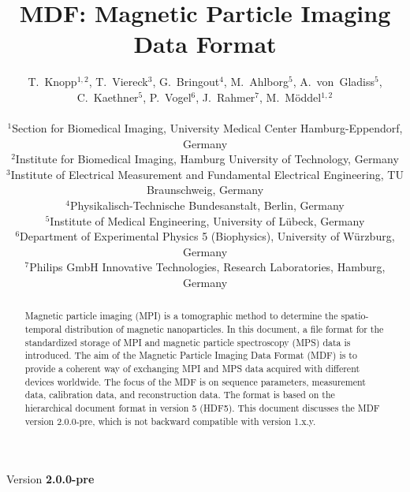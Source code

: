 \documentclass[landscape,a4paper]{article} %
\begin{document}
\title{MDF: Magnetic Particle Imaging Data Format}
\newcommand{\version}{2.0.0-pre}

\author{
T.~Knopp$^{1,2}$, T.~Viereck$^3$, G.~Bringout$^4$, M.~Ahlborg$^5$, A.~von~Gladiss$^5$, C.~Kaethner$^5$, P.~Vogel$^6$, J.~Rahmer$^7$, M.~M\"oddel$^{1,2}$ \\ \\
$^1$Section for Biomedical Imaging, University Medical Center Hamburg-Eppendorf, Germany\\
$^2$Institute for Biomedical Imaging, Hamburg University of Technology, Germany\\
$^3$Institute of Electrical Measurement and Fundamental Electrical Engineering, TU Braunschweig, Germany\\
$^4$Physikalisch-Technische Bundesanstalt, Berlin, Germany\\
$^5$Institute of Medical Engineering, University of  Lübeck, Germany\\
$^6$Department of Experimental Physics 5 (Biophysics), University of Würzburg, Germany\\
$^7$Philips GmbH Innovative Technologies, Research Laboratories, Hamburg, Germany
}

\maketitle
\begin{center}
Version \textbf{\version}
\end{center}

\begin{abstract}
Magnetic particle imaging (MPI) is a tomographic method to determine the spatio-temporal distribution of magnetic nanoparticles. In this document, a file format for the standardized storage of MPI and magnetic particle spectroscopy (MPS) data is introduced. The aim of the Magnetic Particle Imaging Data Format (MDF) is to provide a coherent way of exchanging MPI and MPS data acquired with different devices worldwide. The focus of the MDF is on sequence parameters, measurement data, calibration data, and reconstruction data. The format is based on the hierarchical document format in version 5 (HDF5). This document discusses the MDF version \version, which is not backward compatible with version 1.x.y.
\end{abstract}
\end{document}
